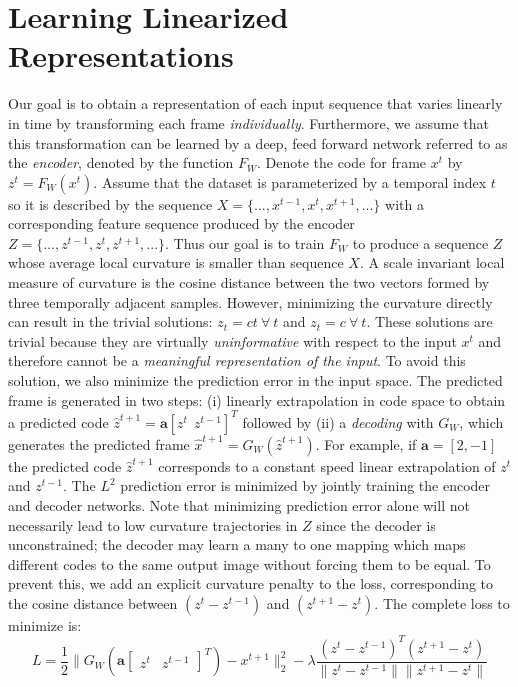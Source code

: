 \documentclass{article} %
\begin{document}
\section{Learning Linearized Representations} 
\label{sec:main}
Our goal is to obtain a representation of each input sequence that varies linearly in time by transforming each frame \emph{individually}. Furthermore, we assume that this transformation can be learned by a deep, feed forward network referred to as the \emph{encoder}, denoted by the function $F_W$.
Denote the code for frame $x^t$ by $z^t = F_W(x^t)$. Assume that the dataset is parameterized by a temporal index $t$ so it is described by the sequence $X = \{...,x^{t-1},x^t,x^{t+1},...\}$ with a corresponding feature sequence produced by the encoder $Z = \{...,z^{t-1},z^t,z^{t+1},...\}$. Thus our goal is to train $F_W$ to produce a sequence $Z$ whose average local curvature is smaller than sequence $X$. A scale invariant local measure of curvature is the cosine distance between the two vectors formed by three temporally adjacent samples. However, minimizing the curvature directly can result in the trivial solutions: $z_t=ct~\forall~t$ and $z_t=c~\forall~t$. These solutions are trivial because they are virtually \emph{uninformative} with respect to the input $x^t$ and therefore cannot be a \emph{meaningful representation of the input}. To avoid this solution, we also minimize the prediction error in the input space. The predicted frame is generated in two steps: (i) linearly extrapolation in code space to obtain a predicted code $\hat z^{t+1} = \mathbf a [z^t~~z^{t-1}]^T$ followed by (ii) a \emph{decoding} with $G_W$, which generates the predicted frame $\hat x^{t+1} = G_W(\hat z^{t+1})$. For example, if $\mathbf{a} = [2,-1]$ the predicted code $\hat z^{t+1}$ corresponds to a constant speed linear extrapolation of $z^t$ and $z^{t-1}$. The $L^2$ prediction error is minimized by jointly training the encoder and decoder networks. Note that minimizing prediction error alone will not necessarily lead to low curvature trajectories in $Z$ since the decoder is unconstrained; the decoder may learn a many to one mapping which maps different codes to the same output image without forcing them to be equal. To prevent this, we add an explicit curvature penalty to the loss, corresponding to the cosine distance between $(z^t-z^{t-1})$ and $(z^{t+1}-z^t)$.    
The complete loss to minimize is: 
\begin{equation}
L = \frac{1}{2}\| G_W(\mathbf a \begin{bmatrix}z^t&z^{t-1}\end{bmatrix}^T) - x^{t+1} \|^2_2 - \lambda \frac{(z^t - z^{t-1})^T(z^{t+1} - z^t)}{\|z^t-z^{t-1}\| \|z^{t+1} - z^t\|}
\label{eqn:loss} 
\end{equation} 
\end{document}
